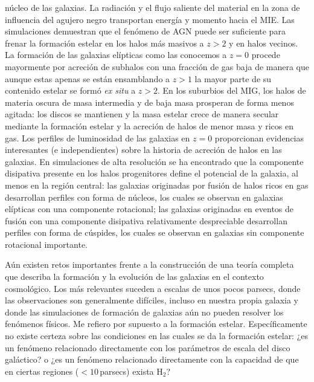 \documentclass{article}
\begin{document}
\begin{description}
núcleo de las galaxias. La radiación y el flujo saliente del material en la zona de influencia del
agujero negro transportan energía y momento hacia el MIE. Las simulaciones demuestran que el
fenómeno de AGN puede ser suficiente para frenar la formación estelar en los halos más masivos a
$z>2$ y en halos vecinos. La formación de las galaxias elípticas como las conocemos a $z=0$ procede
mayormente por acreción de subhalos con una fracción de gas baja de manera que aunque estas apenas
se están ensamblando a $z>1$ la mayor parte de su contenido estelar se formó \emph{ex situ} a
$z>2$. En los suburbios del MIG, los halos de materia oscura de masa intermedia y de baja masa
prosperan de forma menos agitada: los discos se mantienen y la masa estelar crece de manera secular
mediante la formación estelar y la acreción de halos de menor masa y ricos en gas. Los perfiles de
luminosidad de las galaxias en $z=0$ proporcionan evidencias interesantes (e independientes) sobre
la historia de acreción de halos en las galaxias. En simulaciones de alta resolución se ha
encontrado que la componente disipativa presente en los halos progenitores define el potencial de la
galaxia, al menos en la región central: las galaxias originadas por fusión de halos ricos en gas
desarrollan perfiles con forma de núcleos, los cuales se observan en galaxias elípticas con una
componente rotacional; las galaxias originadas en eventos de fusión con una componente disipativa
relativamente despreciable desarrollan perfiles con forma de cúspides, los cuales se observan en
galaxias sin componente rotacional importante.

Aún existen retos importantes frente a la construcción de una teoría completa que describa la
formación y la evolución de las galaxias en el contexto cosmológico. Los más relevantes suceden a
escalas de unos pocos parsecs, donde las observaciones son generalmente difíciles, incluso en
nuestra propia galaxia y donde las simulaciones de formación de galaxias aún no pueden resolver los
fenómenos físicos. Me refiero por supuesto a la formación estelar. Específicamente no existe certeza
sobre las condiciones en las cuales se da la formación estelar: ¿es un fenómeno relacionado
directamente con los parámetros de escala del disco galáctico? o ¿es un fenómeno relacionado
directamente con la capacidad de que en ciertas regiones ($<10\,$parsecs) exista H$_2$?
%
\end{description}

\printbibliography
\end{document}
